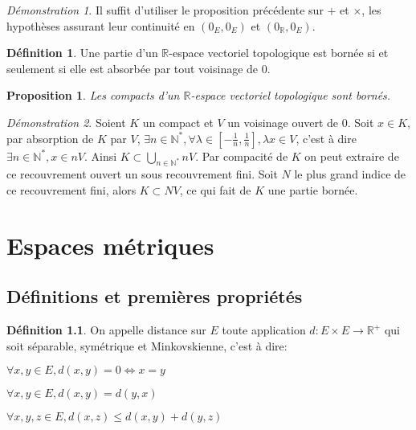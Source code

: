 \documentclass[a4paper, 11pt, french]{book}
\newenvironment{itemise}{\itemize}{\enditemize}
\theoremstyle{plain} %
\newtheorem{proposition}{Proposition}
\theoremstyle{definition} %
\newtheorem{definition}{Définition}
\theoremstyle{remark} %
\newtheorem*{demonstration}{Démonstration}
\newcommand{\1}{\mathds{1}}
\newcommand{\infegal}{\leqslant}
\newcommand{\N}{\mathbb{N}}
\newcommand{\R}{\mathbb{R}}
\begin{document}
\begin{demonstration}
	Il suffit d'utiliser le proposition précédente sur $+$ et $\times$, les hypothèses assurant leur continuité en $(0_E, 0_E)$ et $(0_\R, 0_E)$.
\end{demonstration}

\begin{definition}
	Une partie d'un $\R$-espace vectoriel topologique est bornée si et seulement si elle est absorbée par tout voisinage de 0.
\end{definition}

\begin{proposition}
	Les compacts d'un $\R$-espace vectoriel topologique sont bornés.
\end{proposition}

\begin{demonstration}
	Soient $K$ un compact et $V$ un voisinage ouvert de 0.
	Soit $x\in K$, par absorption de $K$ par $V$, $\exists n\in\N^*, \forall\lambda\in[-\frac{1}{n}, \frac{1}{n}], \lambda x\in V$, c'est à dire $\exists n\in\N^*, x\in nV$.
	Ainsi $K\subset\bigcup_{n\in\N^*}nV$.
	Par compacité de $K$ on peut extraire de ce recouvrement ouvert un sous recouvrement fini.
	Soit $N$ le plus grand indice de ce recouvrement fini, alors $K\subset NV$, ce qui fait de $K$ une partie bornée.
\end{demonstration}

\chapter{Espaces métriques}

\section{Définitions et premières propriétés}

\begin{definition}
	On appelle distance sur $E$ toute application $d:E\times E\rightarrow\R^+$ qui soit séparable, symétrique et Minkovskienne, c'est à dire:
	\begin{itemise}
		\item $\forall x, y\in E, d(x, y)=0\iff x=y$
		\item $\forall x, y\in E, d(x, y)=d(y, x)$
		\item $\forall x, y, z\in E, d(x, z)\infegal d(x, y)+d(y, z)$
	\end{itemise}
\end{definition}
\end{document}
